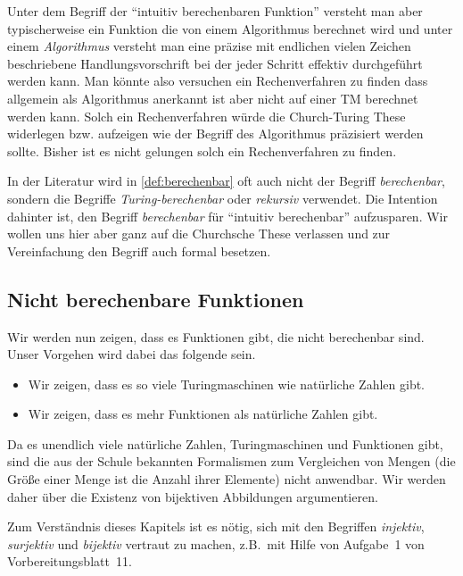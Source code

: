 Unter dem Begriff der ``intuitiv berechenbaren Funktion'' 
versteht man aber typischerweise ein Funktion die von einem Algorithmus berechnet wird
und unter einem \emph{Algorithmus} versteht man eine präzise mit endlichen vielen Zeichen 
beschriebene Handlungsvorschrift bei der jeder Schritt effektiv durchgeführt werden kann.
Man könnte also versuchen ein Rechenverfahren zu finden dass allgemein als Algorithmus anerkannt ist aber nicht auf einer \ac{TM} berechnet werden kann.
Solch ein Rechenverfahren würde die Church-Turing These widerlegen bzw. aufzeigen wie der Begriff des Algorithmus präzisiert werden sollte.
Bisher ist es nicht gelungen solch ein Rechenverfahren zu finden.


\begin{Bemerkung}
	In der Literatur wird in \autoref{def:berechenbar} oft auch nicht der Begriff \emph{berechenbar}, sondern die Begriffe \emph{Turing-berechenbar} oder \emph{rekursiv} verwendet.
	Die Intention dahinter ist, den Begriff \emph{berechenbar} für "`intuitiv berechenbar"' aufzusparen.
	Wir wollen uns hier aber ganz auf die Churchsche These verlassen und zur Vereinfachung den Begriff auch formal besetzen.
\end{Bemerkung}




\subsection{Nicht berechenbare Funktionen}
Wir werden nun zeigen, dass es Funktionen gibt, die nicht berechenbar sind.
Unser Vorgehen wird dabei das folgende sein.
\begin{itemize}
 \item Wir zeigen, dass es so viele Turingmaschinen wie natürliche Zahlen gibt.
 \item Wir zeigen, dass es mehr Funktionen als natürliche Zahlen gibt.
\end{itemize}

Da es unendlich viele natürliche Zahlen, Turingmaschinen und Funktionen gibt,
sind die aus der Schule bekannten Formalismen zum Vergleichen von Mengen
(die Größe einer Menge ist die Anzahl ihrer Elemente)
nicht anwendbar.
Wir werden daher über die Existenz von bijektiven Abbildungen argumentieren.

\begin{Bemerkung}
 Zum Verständnis dieses Kapitels ist es nötig, sich mit den Begriffen \emph{injektiv}, \emph{surjektiv} und \emph{bijektiv} vertraut zu machen,
 z.B.\ mit Hilfe von Aufgabe~1 von Vorbereitungsblatt~11.
\end{Bemerkung}

